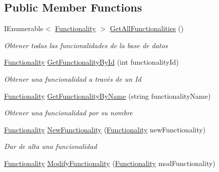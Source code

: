 \subsection*{Public Member Functions}
\begin{DoxyCompactItemize}
\item 
I\+Enumerable$<$ \mbox{\hyperlink{class_h_k_supply_1_1_models_1_1_functionality}{Functionality}} $>$ \mbox{\hyperlink{class_h_k_supply_1_1_services_1_1_implementations_1_1_e_f_functionality_ab92f666d01076cffafbddbb91c5cf6af}{Get\+All\+Functionalities}} ()
\begin{DoxyCompactList}\small\item\em Obtener todas las funcionalidades de la base de datos \end{DoxyCompactList}\item 
\mbox{\hyperlink{class_h_k_supply_1_1_models_1_1_functionality}{Functionality}} \mbox{\hyperlink{class_h_k_supply_1_1_services_1_1_implementations_1_1_e_f_functionality_a0aa6fc75b8f1ddf6532f39a84bc50ad9}{Get\+Functionality\+By\+Id}} (int functionality\+Id)
\begin{DoxyCompactList}\small\item\em Obtener una funcionalidad a través de un Id \end{DoxyCompactList}\item 
\mbox{\hyperlink{class_h_k_supply_1_1_models_1_1_functionality}{Functionality}} \mbox{\hyperlink{class_h_k_supply_1_1_services_1_1_implementations_1_1_e_f_functionality_a655784ce048904e9f27a827ccf2a7a79}{Get\+Functionality\+By\+Name}} (string functionality\+Name)
\begin{DoxyCompactList}\small\item\em Obtener una funcionalidad por su nombre \end{DoxyCompactList}\item 
\mbox{\hyperlink{class_h_k_supply_1_1_models_1_1_functionality}{Functionality}} \mbox{\hyperlink{class_h_k_supply_1_1_services_1_1_implementations_1_1_e_f_functionality_a43852b181d280c78c7c00b9d11c6d6c4}{New\+Functionality}} (\mbox{\hyperlink{class_h_k_supply_1_1_models_1_1_functionality}{Functionality}} new\+Functionality)
\begin{DoxyCompactList}\small\item\em Dar de alta una funcionalidad \end{DoxyCompactList}\item 
\mbox{\hyperlink{class_h_k_supply_1_1_models_1_1_functionality}{Functionality}} \mbox{\hyperlink{class_h_k_supply_1_1_services_1_1_implementations_1_1_e_f_functionality_ae4f83037cd6ef526f55de1a2ba442cc6}{Modify\+Functionality}} (\mbox{\hyperlink{class_h_k_supply_1_1_models_1_1_functionality}{Functionality}} mod\+Functionality)

\end{DoxyCompactItemize}
